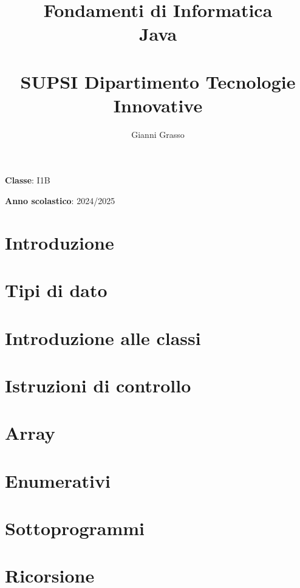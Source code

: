 \documentclass{article}
\title{
    Fondamenti di Informatica \\
    Java \\
    \phantom{}\\
    \large SUPSI Dipartimento Tecnologie Innovative
}
\author{Gianni Grasso}
\begin{document}
\maketitle
\hphantom{ }
\vspace{14.5cm}

\textbf{Classe}: I1B

\textbf{Anno scolastico}: 2024/2025
\pagebreak


\tableofcontents
\pagebreak

\section{Introduzione}

\pagebreak

\section{Tipi di dato}

\pagebreak

\section{Introduzione alle classi}

\pagebreak

\section{Istruzioni di controllo}

\pagebreak

\section{Array}

\pagebreak

\section{Enumerativi}

\pagebreak

\section{Sottoprogrammi}

\pagebreak

\section{Ricorsione}

\pagebreak
\end{document}
